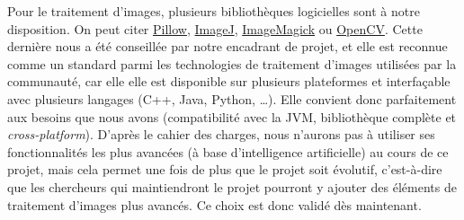 Pour le traitement d'images, plusieurs bibliothèques logicielles sont à notre disposition. On peut citer
\href{https://github.com/python-pillow/Pillow}{Pillow}, \href{https://github.com/imagej/imagej1}{ImageJ},
\href{https://www.imagemagick.org/script/index.php}{ImageMagick} ou \href{https://opencv.org/}{OpenCV}.
Cette dernière nous a été conseillée par notre encadrant de projet, et elle est reconnue comme un
standard parmi les technologies de traitement d'images utilisées par la communauté, car elle elle est
disponible sur plusieurs plateformes et interfaçable avec plusieurs langages (C++, Java, Python, \ldots).
Elle convient donc parfaitement aux besoins que nous avons (compatibilité avec la JVM, bibliothèque complète et
\textit{cross-platform}). D'après le cahier des charges, nous n'aurons pas à utiliser ses fonctionnalités
les plus avancées (à base d'intelligence artificielle) au cours de ce projet, mais cela permet une fois de plus
que le projet soit évolutif, c'est-à-dire que les chercheurs qui maintiendront le projet pourront y ajouter
des éléments de traitement d'images plus avancés. Ce choix est donc validé dès maintenant.